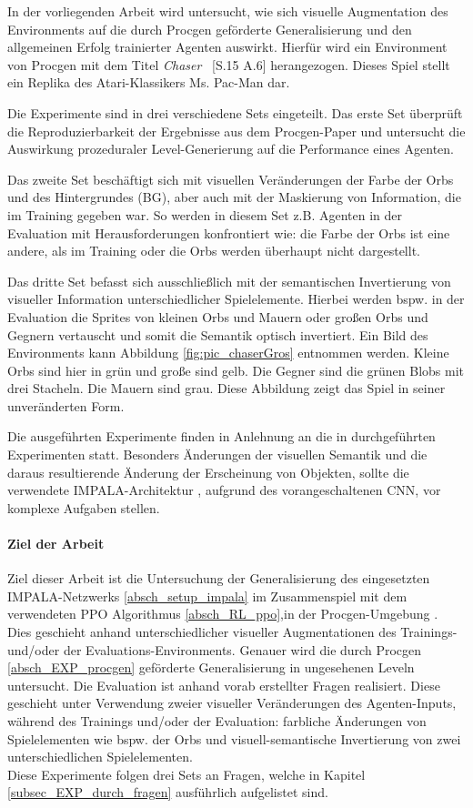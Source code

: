In der vorliegenden Arbeit wird untersucht, wie sich visuelle Augmentation des Environments auf die durch Procgen geförderte Generalisierung und den allgemeinen Erfolg trainierter Agenten auswirkt. Hierfür wird ein Environment von Procgen mit dem Titel \emph{Chaser} \cite{cobbe2019procgen}~[S.15 A.6] herangezogen. Dieses Spiel stellt ein Replika des Atari-Klassikers \dq Ms. Pac-Man\dq{} dar. 

Die Experimente sind in drei verschiedene Sets eingeteilt. Das erste Set überprüft die Reproduzierbarkeit der Ergebnisse aus dem Procgen-Paper und untersucht die Auswirkung prozeduraler Level-Generierung auf die Performance eines Agenten.

Das zweite Set beschäftigt sich mit visuellen Veränderungen der Farbe der Orbs und des Hintergrundes (BG), aber auch mit der Maskierung von Information, die im Training gegeben war. So werden in diesem Set z.B. Agenten in der Evaluation mit Herausforderungen konfrontiert wie: die Farbe der Orbs ist eine andere, als im Training oder die Orbs werden überhaupt nicht dargestellt.

Das dritte Set befasst sich ausschließlich mit der semantischen Invertierung von visueller Information unterschiedlicher Spielelemente. Hierbei werden bspw. in der Evaluation die Sprites von kleinen Orbs und Mauern oder großen Orbs und Gegnern vertauscht und somit die Semantik optisch invertiert. Ein Bild des Environments kann Abbildung \ref{fig:pic_chaserGros} entnommen werden. Kleine Orbs sind hier in grün und große sind gelb. Die Gegner sind die grünen Blobs mit drei Stacheln. Die Mauern sind grau. Diese Abbildung zeigt das Spiel in seiner unveränderten Form. 

Die ausgeführten Experimente finden in Anlehnung an die in \cite{dubey2018investigating} durchgeführten Experimenten statt. Besonders Änderungen der visuellen Semantik und die daraus resultierende Änderung der Erscheinung von Objekten, sollte die verwendete IMPALA-Architektur \cite{espeholt2018impala}, aufgrund des vorangeschaltenen CNN, vor komplexe Aufgaben stellen. 


\paragraph{Ziel der Arbeit}\label{ziel_der_arbeit}
Ziel dieser Arbeit ist die Untersuchung der Generalisierung des eingesetzten IMPALA-Netzwerks \ref{absch_setup_impala} im Zusammenspiel mit dem verwendeten PPO Algorithmus \ref{absch_RL_ppo},in der Procgen-Umgebung \cite{cobbe2019procgen}. Dies geschieht anhand unterschiedlicher visueller Augmentationen des Trainings- und/oder der Evaluations-Environments. Genauer wird die durch Procgen \ref{absch_EXP_procgen} geförderte Generalisierung in ungesehenen Leveln untersucht. Die Evaluation ist anhand vorab erstellter Fragen realisiert. Diese geschieht unter Verwendung zweier visueller Veränderungen des Agenten-Inputs, während des Trainings und/oder der Evaluation: farbliche Änderungen von Spielelementen wie bspw. der Orbs und visuell-semantische Invertierung von zwei unterschiedlichen Spielelementen. \\
Diese Experimente folgen drei Sets an Fragen, welche in Kapitel \ref{subsec_EXP_durch_fragen} ausführlich aufgelistet sind. 


